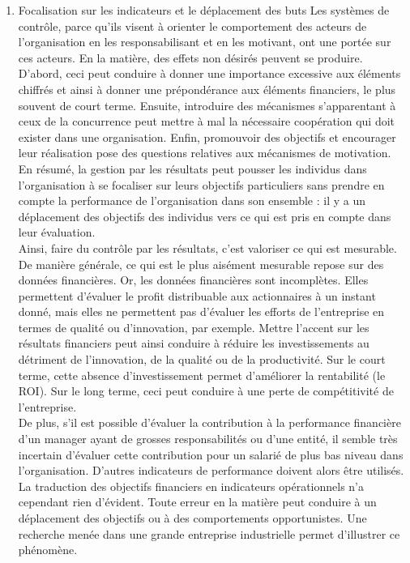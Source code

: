 \documentclass{tufte-handout}
\begin{document}
\begin{enumerate}
\item Focalisation sur les indicateurs et le déplacement des buts
\label{sec:org96a1a71}
Les systèmes de contrôle, parce qu’ils visent à orienter le comportement des acteurs de l’organisation en les responsabilisant et en les motivant, ont une portée sur ces acteurs. En la matière, des effets non désirés peuvent se produire. D’abord, ceci peut conduire à donner une importance excessive aux éléments chiffrés et ainsi à donner une prépondérance aux éléments financiers, le plus souvent de court terme. Ensuite, introduire des mécanismes s’apparentant à ceux de la concurrence peut mettre à mal la nécessaire coopération qui doit exister dans une organisation. Enfin, promouvoir des objectifs et encourager leur réalisation pose des questions relatives aux mécanismes de motivation. En résumé, la gestion par les résultats peut pousser les individus dans l’organisation à se focaliser sur leurs objectifs particuliers sans prendre en compte la performance de l’organisation dans son ensemble : il y a un déplacement des objectifs des individus vers ce qui est pris en compte dans leur évaluation.\\

Ainsi, faire du contrôle par les résultats, c’est valoriser ce qui est mesurable. De manière générale, ce qui est le plus aisément mesurable repose sur des données financières. Or, les données financières sont incomplètes. Elles permettent d’évaluer le profit distribuable aux actionnaires à un instant donné, mais elles ne permettent pas d’évaluer les efforts de l’entreprise en termes de qualité ou d’innovation, par exemple. Mettre l’accent sur les résultats financiers peut ainsi conduire à réduire les investissements au détriment de l’innovation, de la qualité ou de la productivité. Sur le court terme, cette absence d’investissement permet d’améliorer la rentabilité (le ROI). Sur le long terme, ceci peut conduire à une perte de compétitivité de l’entreprise.\\

De plus, s’il est possible d’évaluer la contribution à la performance financière d’un manager ayant de grosses responsabilités ou d’une entité, il semble très incertain d’évaluer cette contribution pour un salarié de plus bas niveau dans l’organisation. D’autres indicateurs de performance doivent alors être utilisés. La traduction des objectifs financiers en indicateurs opérationnels n’a cependant rien d’évident. Toute erreur en la matière peut conduire à un déplacement des objectifs ou à des comportements opportunistes. Une recherche menée dans une grande entreprise industrielle permet d’illustrer ce phénomène.\\


\end{enumerate}
\end{document}
